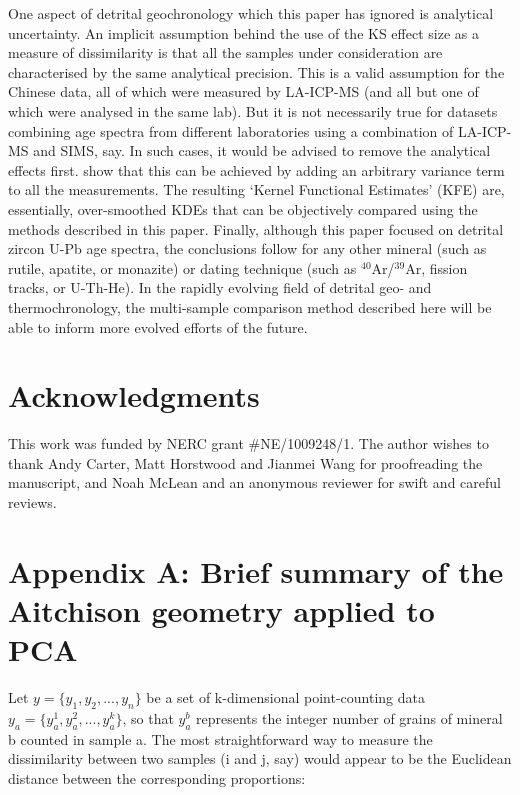 \documentclass[authoryear,preprint,review,12pt]{elsarticle}
\begin{document}
One aspect of detrital geochronology which this paper has ignored is
analytical uncertainty. An implicit assumption behind the use of the
KS effect size as a measure of dissimilarity is that all the samples
under consideration are characterised by the same analytical
precision. This is a valid assumption for the Chinese data, all of
which were measured by LA-ICP-MS (and all but one of which were
analysed in the same lab). But it is not necessarily true for datasets
combining age spectra from different laboratories using a combination
of LA-ICP-MS and SIMS, say. In such cases, it would be advised to
remove the analytical effects first.  \citet{sircombe2004a} show that
this can be achieved by adding an arbitrary variance term to all the
measurements. The resulting `Kernel Functional Estimates' (KFE) are,
essentially, over-smoothed KDEs that can be objectively compared using
the methods described in this paper.  Finally, although this paper
focused on detrital zircon U-Pb age spectra, the conclusions follow
for any other mineral (such as rutile, apatite, or monazite) or dating
technique (such as $^{40}$Ar/$^{39}$Ar, fission tracks, or
U-Th-He). In the rapidly evolving field of detrital geo- and
thermochronology, the multi-sample comparison method described here
will be able to inform more evolved efforts of the future.

\section*{Acknowledgments}

This work was funded by NERC grant \#NE/1009248/1. The author wishes
to thank Andy Carter, Matt Horstwood and Jianmei Wang for proofreading
the manuscript, and Noah McLean and an anonymous reviewer for swift
and careful reviews.

\renewcommand{\theequation}{A-\arabic{equation}}
  \setcounter{equation}{0}  %

\section*{Appendix A: Brief summary of the Aitchison geometry applied to PCA}

Let $y = \{y_1,y_2,...,y_n\}$ be a set of k-dimensional point-counting
data $y_a=\{y_a^1,y_a^2,...,y_a^k\}$, so that $y_a^b$ represents the
integer number of grains of mineral b counted in sample a. The most
straightforward way to measure the dissimilarity between two samples
(i and j, say) would appear to be the Euclidean distance between the
corresponding proportions:
\end{document}
